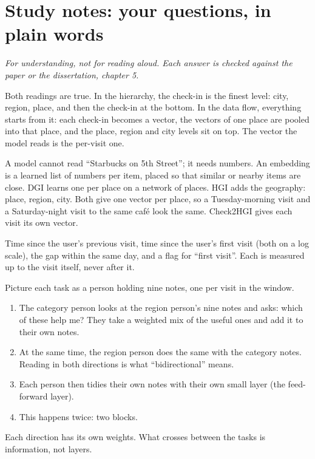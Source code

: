 \section{Study notes: your questions, in plain words}
\textit{For understanding, not for reading aloud. Each answer is checked against the paper or the
dissertation, chapter 5.}

Both readings are true. In the hierarchy, the check-in is the finest level: city, region, place, and
then the check-in at the bottom. In the data flow, everything starts from it: each check-in becomes a
vector, the vectors of one place are pooled into that place, and the place, region and city levels sit
on top. The vector the model reads is the per-visit one.

A model cannot read ``Starbucks on 5th Street''; it needs numbers. An embedding is a learned list of
numbers per item, placed so that similar or nearby items are close. DGI learns one per place on a
network of places. HGI adds the geography: place, region, city. Both give one vector per place, so a
Tuesday-morning visit and a Saturday-night visit to the same café look the same. Check2HGI gives each
visit its own vector.

Time since the user's previous visit, time since the user's first visit (both on a log scale), the gap
within the same day, and a flag for ``first visit''. Each is measured up to the visit itself, never
after it.

Picture each task as a person holding nine notes, one per visit in the window.
\begin{enumerate}
  \item The category person looks at the region person's nine notes and asks: which of these help me?
        They take a weighted mix of the useful ones and add it to their own notes.
  \item At the same time, the region person does the same with the category notes. Reading in both
        directions is what ``bidirectional'' means.
  \item Each person then tidies their own notes with their own small layer (the feed-forward layer).
  \item This happens twice: two blocks.
\end{enumerate}
Each direction has its own weights. What crosses between the tasks is information, not layers.

